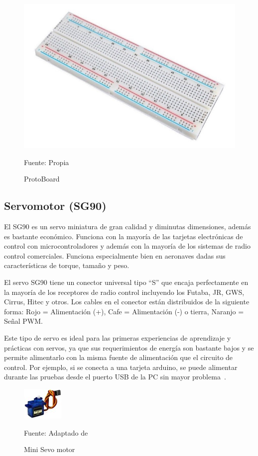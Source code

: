 \begin{figure}[htb]
	\centering
	\includegraphics[scale  = 0.50]{Imagenes/bread.jpg}
	\caption{ProtoBoard}{Fuente: Propia}
\end{figure}

\subsection{Servomotor (SG90)}
El SG90 es un servo miniatura de gran calidad y diminutas dimensiones, además es bastante económico. Funciona con la mayoría de las tarjetas electrónicas de control con microcontroladores y además con la mayoría de los sistemas de radio control comerciales. Funciona especialmente bien en aeronaves dadas sus características de torque, tamaño y peso.

El servo SG90 tiene un conector universal tipo “S” que encaja perfectamente en la mayoría de los receptores de radio control incluyendo los Futaba, JR, GWS, Cirrus, Hitec y otros. Los cables en el conector están distribuidos de la siguiente forma: Rojo = Alimentación (+), Cafe = Alimentación (-) o tierra, Naranjo = Señal PWM.

Este tipo de servo es ideal para las primeras experiencias de aprendizaje y prácticas con servos, ya que sus requerimientos de energía son bastante bajos y se permite alimentarlo con la misma fuente de alimentación que el circuito de control. Por ejemplo, si se conecta a una tarjeta arduino, se puede alimentar durante las pruebas desde el puerto USB de la PC sin mayor problema~\cite{servo_motor}.

\begin{figure}[H]
	\centering
	\includegraphics[scale  = 0.50]{Imagenes/micro.jpg}
	\caption{Mini Sevo motor}{Fuente: Adaptado de~\cite{servo_motor}}
\end{figure}

